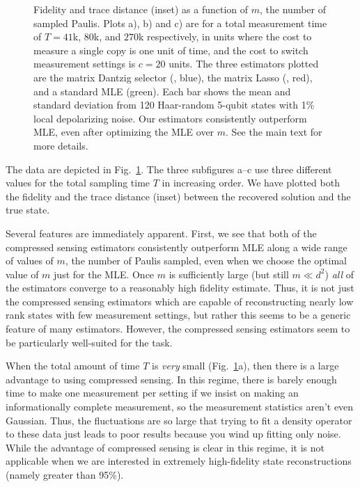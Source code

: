 \begin{figure}[t!]
\begin{tabular}{c}
\end{tabular}
\begin{caption}{\label{F:numerics}Fidelity and trace distance (inset) as a function of $m$, the number of sampled Paulis. Plots a), b) and c) are for a total measurement time of $T=41$k, $80$k, and $270$k respectively, in units where the cost to measure a single copy is one unit of time, and the cost to switch measurement settings is $c=20$ units. The three estimators plotted are the matrix Dantzig selector (, blue), the matrix Lasso (, red), and a standard MLE (green). Each bar shows the mean and standard deviation from 120 Haar-random 5-qubit states with 1\% local depolarizing noise. Our estimators consistently outperform MLE, even after optimizing the MLE over $m$. See the main text for more details.\vspace{-5pt}}
\end{caption}
\end{figure}


The data are depicted in Fig.~\ref{F:numerics}. The three subfigures a--c use three different values for the total sampling time $T$ in increasing order. We have plotted both the fidelity and the trace distance (inset) between the recovered solution and the true state. %

Several features are immediately apparent. First, we see that both of the compressed sensing estimators consistently outperform MLE along a wide range of values of $m$, the number of Paulis sampled, even when we choose the optimal value of $m$ just for the MLE. Once $m$ is sufficiently large (but still $m \ll d^2$) \emph{all} of the estimators converge to a reasonably high fidelity estimate. Thus, it is not just the compressed sensing estimators which are capable of reconstructing nearly low rank states with few measurement settings, but rather this seems to be a generic feature of many estimators. However, the compressed sensing estimators seem to be particularly well-suited for the task. 

When the total amount of time $T$ is \emph{very} small (Fig.~\ref{F:numerics}a), then there is a large advantage to using compressed sensing. In this regime, there is barely enough time to make one measurement per setting if we insist on making an informationally complete measurement, so the measurement statistics aren't even Gaussian. Thus, the fluctuations are so large that trying to fit a density operator to these data just leads to poor results because you wind up fitting only noise. While the advantage of compressed sensing is clear in this regime, it is not applicable when we are interested in extremely high-fidelity state reconstructions (namely greater than 95\%). 

